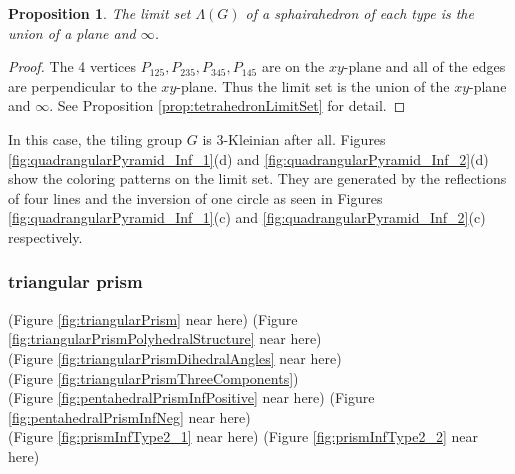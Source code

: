 \documentclass[suppldata, dvipdfmx]{interact}
\theoremstyle{plain}%
\newtheorem{proposition}[theorem]{Proposition}
\theoremstyle{definition}
\theoremstyle{remark}
\theoremstyle{problemstyle}
\begin{document}
\begin{proposition}
The limit set $\Lambda(G)$ of a sphairahedron of each type is  the union of a plane and $\infty$. 
\end{proposition}

\begin{proof}
The 4 vertices $P_{125}, P_{235}, P_{345}, P_{145}$ are on the $xy$-plane and all of the edges are perpendicular to the $xy$-plane.  Thus the limit set is the union of the $xy$-plane and $\infty$.  See Proposition \ref{prop:tetrahedronLimitSet} for detail.
\end{proof}

In this case, the tiling group $G$ is $3$-Kleinian after all.  Figures \ref{fig:quadrangularPyramid_Inf_1}(d) and \ref{fig:quadrangularPyramid_Inf_2}(d) show the coloring patterns on the limit set.  They are generated by the reflections of four lines and the inversion of one circle as seen in Figures \ref{fig:quadrangularPyramid_Inf_1}(c) and \ref{fig:quadrangularPyramid_Inf_2}(c) respectively.


\subsubsection{triangular prism}

\noindent(Figure \ref{fig:triangularPrism} near here)
(Figure \ref{fig:triangularPrismPolyhedralStructure} near here)\\
(Figure \ref{fig:triangularPrismDihedralAngles}
 near here)\\
(Figure \ref{fig:triangularPrismThreeComponents})\\
(Figure \ref{fig:pentahedralPrismInfPositive}
 near here)
(Figure \ref{fig:pentahedralPrismInfNeg}
 near here)\\
(Figure \ref{fig:prismInfType2_1}
 near here)
(Figure \ref{fig:prismInfType2_2}
 near here)\\
\end{document}
